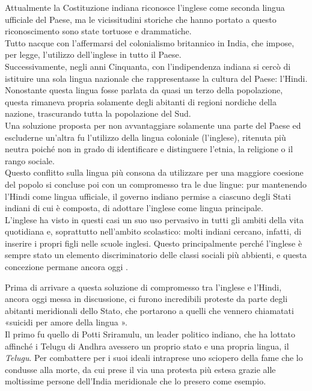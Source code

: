 Attualmente la Costituzione indiana riconosce l'inglese come seconda lingua ufficiale del Paese, ma le vicissitudini storiche che hanno portato a questo riconoscimento sono state tortuose e drammatiche.\\
Tutto nacque con l'affermarsi del colonialismo britannico in India, che impose, per legge, l'utilizzo dell'inglese in tutto il Paese.\\
Successivamente, negli anni Cinquanta, con l'indipendenza indiana si cercò di istituire una sola lingua nazionale che rappresentasse la cultura del Paese: l'Hindi. Nonostante questa lingua fosse parlata da quasi un terzo della popolazione, questa rimaneva propria solamente degli abitanti di regioni nordiche della nazione, trascurando tutta la popolazione del Sud.\\
Una soluzione proposta per non avvantaggiare solamente una parte del Paese ed escluderne un'altra fu l'utilizzo della lingua coloniale (l'inglese), ritenuta più neutra poiché non in grado di identificare e distinguere l'etnia, la religione o il rango sociale.\\
Questo conflitto sulla lingua più consona da utilizzare per una maggiore coesione del popolo si concluse poi con un compromesso tra le due lingue: pur mantenendo l'Hindi come lingua ufficiale, il governo indiano permise a ciascuno degli Stati indiani di cui è composta, di adottare l'inglese come lingua principale.\\
L'inglese ha visto in questi casi un suo uso pervasivo in tutti gli ambiti della vita quotidiana e, soprattutto nell'ambito scolastico: molti indiani cercano, infatti, di inserire i propri figli nelle scuole inglesi. Questo principalmente perché l'inglese è sempre stato un elemento discriminatorio delle classi sociali più abbienti, e questa concezione permane ancora oggi \parencite{indiamodi}. 

Prima di arrivare a questa soluzione di compromesso tra l'inglese e l'Hindi, ancora oggi messa in discussione, ci furono incredibili proteste da parte degli abitanti meridionali dello Stato, che portarono a quelli che vennero chiamatati «suicidi per amore della lingua \parencite{language_emotion_politics}».\\
Il primo fu quello di Potti Sriramulu, un leader politico indiano, che ha lottato affinché i Telugu di Andhra avessero un proprio stato e una propria lingua, il \textit{Telugu}. Per combattere per i suoi ideali intraprese uno sciopero della fame che lo condusse alla morte, da cui prese il via una protesta più estesa grazie alle moltissime persone dell'India meridionale che lo presero come esempio. 

